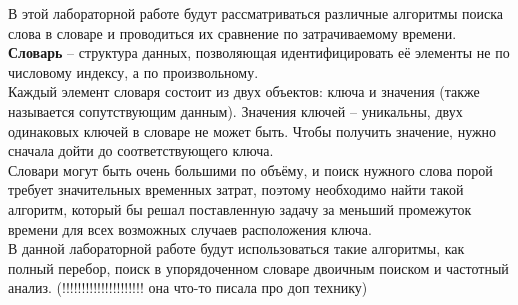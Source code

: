 В этой лабораторной работе будут рассматриваться различные алгоритмы поиска слова в словаре и проводиться их сравнение по затрачиваемому времени. \\

\textbf{Словарь} -- структура данных, позволяющая идентифицировать её элементы не по числовому индексу, а по произвольному. \\

Каждый элемент словаря состоит из двух объектов: ключа и значения (также называется сопутствующим данным). Значения ключей -- уникальны, двух одинаковых ключей в словаре не может быть. Чтобы получить значение, нужно сначала дойти до соответствующего ключа.\\

Словари могут быть очень большими по объёму, и поиск нужного слова порой требует значительных временных затрат, поэтому необходимо найти такой алгоритм, который бы решал поставленную задачу за меньший промежуток времени для всех возможных случаев расположения ключа.\\

В данной лабораторной работе будут использоваться такие алгоритмы, как полный перебор, поиск в упорядоченном словаре двоичным поиском и частотный анализ. (!!!!!!!!!!!!!!!!!!!!! она что-то писала про доп технику) 

